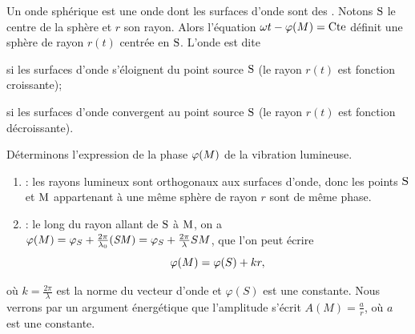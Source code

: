 \documentclass[12pt,fancy]{cours}
\begin{document}
 Un onde sphérique est une onde dont les surfaces d'onde sont des . Notons $\rm S$ le centre de la sphère et $r$ son rayon. Alors l'équation $\omega t - \varphi(M) = \text{Cte}$ définit une sphère de rayon $r(t)$ centrée en $\rm S$.   L'onde est dite
\begin{liste}
  \item {} si les surfaces d'onde s'éloignent du point source $\rm S$ (le rayon $r(t)$ est fonction croissante);
  \item {} si les surfaces d'onde convergent au point source $\rm S$ (le rayon $r(t)$ est fonction décroissante).
\end{liste}
Déterminons l'expression de la phase $\varphi(M)$ de la vibration lumineuse.

  \begin{enumerate}
    \item {} : les rayons lumineux sont orthogonaux aux surfaces d'onde, donc les points $\rm S$ et $\rm M$ appartenant à une même sphère de rayon $r$ sont de même phase.
    \item {} : le long du rayon allant de $\rm S$ à $\rm M$, on a
    $\varphi(M) = \varphi_S + \frac{2\pi}{\lambda_0}\mathit{(SM)} = \varphi_S + \frac{2\pi}{\lambda} SM$, que l’on peut écrire
    \begin{equation}
    \varphi(M) = \varphi(S) + k r,
    \end{equation}
  \end{enumerate}
  où $k=\frac{2\pi}{\lambda}$ est la norme du vecteur d’onde et $\varphi(S)$ est une constante. Nous verrons par un argument énergétique que l'amplitude s'écrit $A(M) = \frac{a}{r}$, où $a$ est une constante.
\end{document}
